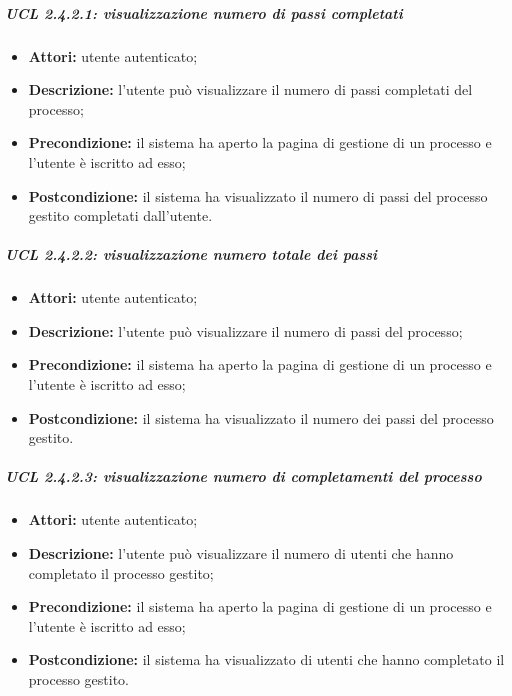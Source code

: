 \subparagraph{UCL 2.4.2.1: visualizzazione numero di passi completati}
\begin{itemize}
\item \textbf{Attori:} utente autenticato;
\item \textbf{Descrizione:} l'utente può visualizzare il numero di passi completati del processo;
\item \textbf{Precondizione:} il sistema ha aperto la pagina di gestione di un processo e l'utente è iscritto ad esso;
\item \textbf{Postcondizione:} il sistema ha visualizzato il numero di passi del processo gestito completati dall'utente.
\end{itemize}

\subparagraph{UCL 2.4.2.2: visualizzazione numero totale dei passi}
\begin{itemize}
\item \textbf{Attori:} utente autenticato;
\item \textbf{Descrizione:} l'utente può visualizzare il numero di passi del processo;
\item \textbf{Precondizione:} il sistema ha aperto la pagina di gestione di un processo e l'utente è iscritto ad esso;
\item \textbf{Postcondizione:} il sistema ha visualizzato il numero dei passi del processo gestito.
\end{itemize}

\subparagraph{UCL 2.4.2.3: visualizzazione numero di completamenti del processo}
\begin{itemize}
\item \textbf{Attori:} utente autenticato;
\item \textbf{Descrizione:} l'utente può visualizzare il numero di utenti che hanno completato il processo gestito;
\item \textbf{Precondizione:} il sistema ha aperto la pagina di gestione di un processo e l'utente è iscritto ad esso;
\item \textbf{Postcondizione:} il sistema ha visualizzato di utenti che hanno completato il processo gestito.
\end{itemize}

